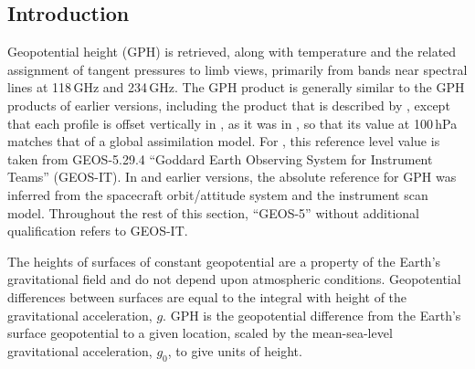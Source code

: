 
\subsection{Introduction}

Geopotential height (GPH) is retrieved, along with temperature and the related assignment of tangent pressures to limb views, primarily from bands near  spectral lines at 118\,GHz and 234\,GHz. The \thisv GPH product is generally similar to the GPH products of earlier versions, including the \vii product that is described by \citet{SchwartzEtal:2008:Validation}, except that each profile is offset vertically in \thisv, as it was in \prevv, so that its value at 100\,hPa matches that of a global assimilation model. For \thisv, this reference level value is taken from \mbox{GEOS-5.29.4} ``Goddard Earth Observing System for Instrument Teams'' (\mbox{GEOS-IT}). In \viv and earlier versions, the absolute reference for GPH was inferred from the spacecraft orbit/attitude system and the instrument scan model. Throughout the rest of this section, ``\mbox{GEOS-5}'' without additional qualification refers to \mbox{GEOS-IT}.

The heights of surfaces of constant geopotential are a property of the Earth's gravitational field and do not depend upon atmospheric conditions. Geopotential differences between surfaces are equal to the integral with height of the gravitational acceleration, $g$. GPH is the geopotential difference from the Earth's surface geopotential to a given location, scaled by the mean-sea-level gravitational acceleration, $g_0$, to give units of height.

